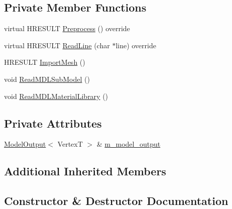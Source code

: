 \subsection*{Private Member Functions}
\begin{DoxyCompactItemize}
\item 
virtual H\+R\+E\+S\+U\+LT \hyperlink{classmage_1_1_m_d_l_reader_a90958769a03cd25246b3aae740ecbcd6}{Preprocess} () override
\item 
virtual H\+R\+E\+S\+U\+LT \hyperlink{classmage_1_1_m_d_l_reader_a9c38ef1fdaf1e4bda13392b4cb0c29cf}{Read\+Line} (char $\ast$line) override
\item 
H\+R\+E\+S\+U\+LT \hyperlink{classmage_1_1_m_d_l_reader_aa814a809bb990d0b51456697d84a3a35}{Import\+Mesh} ()
\item 
void \hyperlink{classmage_1_1_m_d_l_reader_a78e12dbf59382cde7a56c323918d5bc2}{Read\+M\+D\+L\+Sub\+Model} ()
\item 
void \hyperlink{classmage_1_1_m_d_l_reader_a5fa8fa91dca9bea47a6bbf407e854be7}{Read\+M\+D\+L\+Material\+Library} ()
\end{DoxyCompactItemize}
\subsection*{Private Attributes}
\begin{DoxyCompactItemize}
\item 
\hyperlink{structmage_1_1_model_output}{Model\+Output}$<$ VertexT $>$ \& \hyperlink{classmage_1_1_m_d_l_reader_a41392308792749b78657497b69add850}{m\+\_\+model\+\_\+output}
\end{DoxyCompactItemize}
\subsection*{Additional Inherited Members}


\subsection{Constructor \& Destructor Documentation}
\hypertarget{classmage_1_1_m_d_l_reader_a068ed8c9101b42033ea166ab7aa03c04}{}\label{classmage_1_1_m_d_l_reader_a068ed8c9101b42033ea166ab7aa03c04} 
